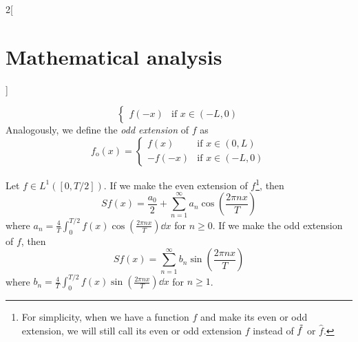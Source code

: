 \documentclass[../../../main_math.tex]{subfiles}
\begin{document}
\begin{multicols}{2}[\section{Mathematical analysis}]
\begin{definition}
$$\begin{cases}
        f(-x) & \text{if }x\in(-L,0)
      \end{cases}$$ Analogously, we define the \emph{odd extension} of $f$ as $$f_\mathrm{o}(x)=
      \begin{cases}
        f(x)   & \text{if }x\in(0,L)  \\
        -f(-x) & \text{if }x\in(-L,0)
      \end{cases}$$
  \end{definition}
  \begin{proposition}
    Let $f\in L^1([0,T/2])$. If we make the even extension of $f$\footnote{For simplicity, when we have a function $f$ and make its even or odd extension, we will still call its even or odd extension $f$ instead of $\Tilde{f}$ or $\hat{f}$.}, then $$Sf(x)=\frac{a_0}{2}+\sum_{n=1}^\infty a_n\cos\left(\frac{2\pi nx}{T}\right)$$ where $\displaystyle a_n=\frac{4}{T}\int_0^{T/2}f(x)\cos\left(\frac{2\pi nx}{T}\right)\dd{x}$ for $n\geq 0$. If we make the odd extension of $f$, then $$Sf(x)=\sum_{n=1}^\infty b_n\sin\left(\frac{2\pi nx}{T}\right)$$ where $\displaystyle b_n=\frac{4}{T}\int_0^{T/2}f(x)\sin\left(\frac{2\pi nx}{T}\right)\dd{x}$ for $n\geq 1$.
  \end{proposition}

\end{multicols}
\end{document}
